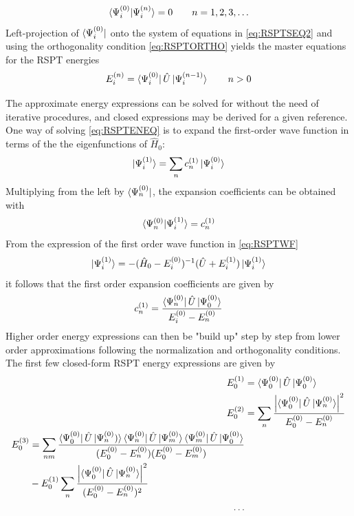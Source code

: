 \begin{equation}
\bra{\smash{\Psi_i^{(0)}}}\ket{\smash{\Psi_i^{(n)}}} = 0 \qquad n = 1,2,3,\ldots
\label{eq:RSPTORTHO}
\end{equation}
\noindent Left-projection of $\bra{\smash{\Psi_i^{(0)}}}$ onto the system of equations in \ref{eq:RSPTSEQ2} and using the orthogonality condition \ref{eq:RSPTORTHO} yields the master equations for the RSPT energies
\begin{equation}
E_i^{(n)} = \bra{\smash{\Psi_i^{(0)}}} \hat{U} \ket{\smash{\Psi_i^{(n-1)}}} \qquad n > 0
\label{eq:RSPTENEQ}
\end{equation}

\noindent The approximate energy expressions can be solved for without the need of iterative procedures, and closed expressions may be derived for a given reference. One way of solving \ref{eq:RSPTENEQ} is to expand the first-order wave function in terms of the the eigenfunctions of $\hat{H}_0$:
\begin{equation}
\ket{\smash{\Psi_i^{(1)}}} = \sum_n c^{(1)}_n \ket{\smash{\Psi_i^{(0)}}}
\end{equation}
\noindent Multiplying from the left by $\bra{\smash{\Psi_n^{(0)}}}$, the expansion coefficients can be obtained with
\begin{equation}
\bra{\smash{\Psi_n^{(0)}}}\ket{\smash{\Psi_i^{(1)}}} = c_n^{(1)}
\end{equation}
From the expression of the first order wave function in \ref{eq:RSPTWF}
\begin{equation}
\ket{\smash{\Psi_i^{(1)}}} = - (\hat{H}_0 - E_i^{(0)})^{-1} (\hat{U} + E_i^{(1)}) \ket{\smash{\Psi_i^{(1)}}} 
\end{equation}
\noindent it follows that the first order expansion coefficients are given by
\begin{equation}
c_n^{(1)} = \frac{\bra{\smash{\Psi_n^{(0)}}} \hat{U} \ket{\smash{\Psi_0^{(0)}}}}{E_i^{(0)} - E_n^{(0)}} 
\end{equation}
\noindent Higher order energy expressions can then be "build up" step by step from lower order approximations following the normalization and orthogonality conditions. The first few closed-form RSPT energy expressions are given by
\begin{align}
E_0^{(1)} &= \bra{\smash{\Psi_0^{(0)}}} \hat{U} \ket{\smash{\Psi_0^{(0)}}} \\
E_0^{(2)} &= \sum_n \frac{
	\left\lvert \bra{\smash{\Psi_0^{(0)}}} \hat{U}\ket{\smash{\Psi_n^{(0)}}} \right\rvert^2
}{
	E_0^{(0)} - E_n^{(0)}
} \\
\begin{split}
E_0^{(3)} &= \sum_{nm} \frac{
	\bra{\smash{\Psi_0^{(0)}}}\hat{U}\ket{\smash{\Psi_n^{(0)})}}
	\bra{\smash{\Psi_n^{(0)}}}\hat{U}\ket{\smash{\Psi_m^{(0)}}}
	\bra{\smash{\Psi_m^{(0)}}}\hat{U}\ket{\smash{\Psi_0^{(0)}}}
}{
	(E_0^{(0)} - E_n^{(0)})(E_0^{(0)} - E_m^{(0)})
} \\
&- E_0^{(1)} \sum_n \frac{
	\left\lvert \bra{\smash{\Psi_0^{(0)}}} \hat{U}\ket{\smash{\Psi_n^{(0)}}} \right\rvert^2
}{
	(E_0^{(0)} - E_n^{(0)})^2
} 
\end{split} \\ \nonumber
\ldots
\end{align}

